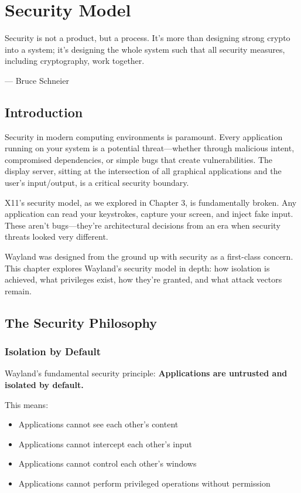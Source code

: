 \chapter{Security Model}
\label{ch:security-model}

\epigraph{Security is not a product, but a process. It's more than designing strong crypto into a system; it's designing the whole system such that all security measures, including cryptography, work together.}{--- Bruce Schneier}

\section{Introduction}

Security in modern computing environments is paramount. Every application running on your system is a potential threat—whether through malicious intent, compromised dependencies, or simple bugs that create vulnerabilities. The display server, sitting at the intersection of all graphical applications and the user's input/output, is a critical security boundary.

X11's security model, as we explored in Chapter 3, is fundamentally broken. Any application can read your keystrokes, capture your screen, and inject fake input. These aren't bugs—they're architectural decisions from an era when security threats looked very different.

Wayland was designed from the ground up with security as a first-class concern. This chapter explores Wayland's security model in depth: how isolation is achieved, what privileges exist, how they're granted, and what attack vectors remain.

\section{The Security Philosophy}

\subsection{Isolation by Default}

Wayland's fundamental security principle: \textbf{Applications are untrusted and isolated by default.}

This means:
\begin{itemize}
    \item Applications cannot see each other's content
    \item Applications cannot intercept each other's input
    \item Applications cannot control each other's windows
    \item Applications cannot perform privileged operations without permission
\end{itemize}

